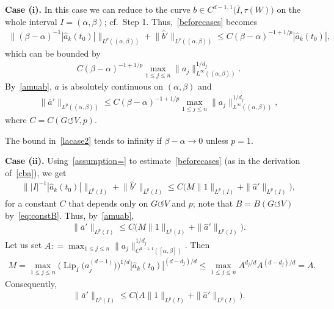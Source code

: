 \documentclass[11pt]{article}
\numberwithin{equation}{section}
\numberwithin{equation}{section}
\def\al{\alpha}
\def\be{\beta}
\def\ta{\tau}
\def\ol{\overline}
\def\Lip{\on{Lip}}
\def\const{M}
\def\we{\hat}
\def\acts{\circlearrowleft}
\let\on=\operatorname
\begin{document}
\medskip\noindent
{\bf Case ($\boldsymbol i$).}
In this case we can reduce to the curve $b \in C^{d-1,1}\big(\overline I,\ta(W)\big)$ on the whole interval $I=(\al,\be)$; cf.\
Step 1. Thus,~\eqref{beforecases} becomes
\begin{gather*}
 \big\|(\be-\al)^{-1} |\we a_k (t_0)| \big\|_{L^p ((\al,\be))}
 + \big\|\we b'\big\|_{L^p((\al,\be))}
 \le C (\be-\al)^{-1+1/p} |\we a_k(t_0)|,
\end{gather*}
which can be bounded by
\begin{gather*} %
 C (\be-\al)^{-1+1/p} \max_{1 \le j \le n} \| a_j\|^{1/d_j}_{L^\infty((\al,\be))}.
\end{gather*}
By~\eqref{amuab}, $\ol a$ is absolutely continuous on $(\al,\be)$ and
\begin{gather} \label{lacase2}
 \|\ol a'\|_{L^p((\al,\be))} \le C (\be-\al)^{-1+1/p} \max_{1 \le j \le n} \|a_j\|^{1/d_j}_{L^\infty((\al,\be))},
\end{gather}
where $C = C(G \acts V,p)$.

\begin{Remark} %
The bound in~\eqref{lacase2} tends to infinity if $\be - \al \to 0$ unless $p=1$.
\end{Remark}


\medskip\noindent
{\bf Case ($\boldsymbol{ii}$).}
Using~\eqref{assumption=} to estimate~\eqref{beforecases} (as in the derivation of~\eqref{cba}),
we get
\begin{gather*}
 \||I|^{-1} |\we a_k (t_0)| \|_{L^p (I)} + \big\|\we b'\big\|_{L^p(I)}
 \le C \big(\const\|1\|_{L^p(I)} + \|\we a'\|_{L^p (I)}\big), %
\end{gather*}
for a constant $C$ that depends only on $G \acts V$ and $p$; note that $B=B(G \acts V)$ by~\eqref{eq:constB}.
Thus, by~\eqref{amuab},
\begin{gather*}
 \|\ol a'\|_{L^p(I)} \le C \big(\const \|1\|_{L^p(I)} + \|\we a'\|_{L^p (I)}\big).
\end{gather*}
Let us set $A : = \max_{1 \le j \le n} \| a_j\|^{1/d_j}_{C^{d-1,1}([\al,\be])}$. Then
\begin{gather*}
 \const = \max_{1 \le j\le n} \big(\Lip_I\big(a_j^{(d-1)}\big)\big)^{1/d} |\we a_k (t_0)|^{(d-d_j)/d}
 \le \max_{1 \le j\le n} A^{d_j/d} A^{(d-d_j)/d} = A.
\end{gather*}
Consequently,
\begin{gather} \label{eq:laIA}
 \|\ol a'\|_{L^p(I)} \le C \big(A \|1\|_{L^p(I)} + \|\we a'\|_{L^p (I)}\big).
\end{gather}
\end{document}
